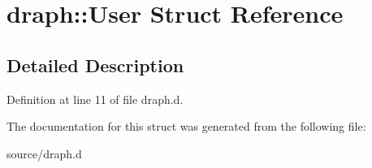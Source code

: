 \hypertarget{structdraph_1_1User}{}\section{draph\+:\+:User Struct Reference}
\label{structdraph_1_1User}


\subsection{Detailed Description}


Definition at line 11 of file draph.\+d.



The documentation for this struct was generated from the following file\+:\begin{DoxyCompactItemize}
\item 
source/draph.\+d\end{DoxyCompactItemize}
